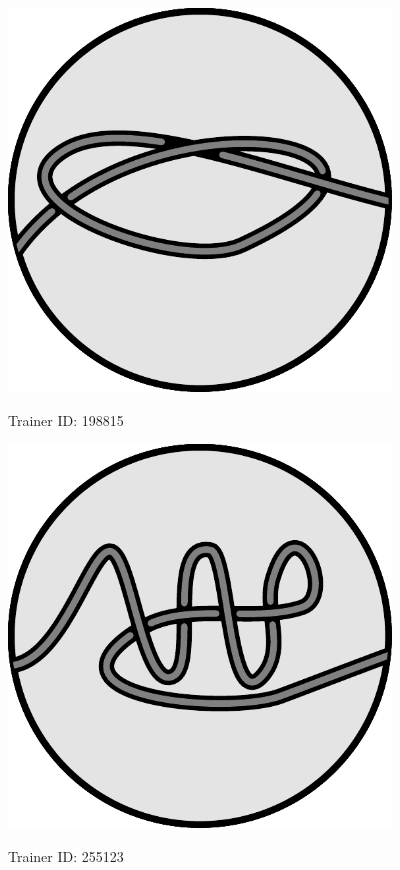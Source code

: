  \begin{center}

    \includegraphics[width=4in]{assets/knot1.pdf}

    \Huge Trainer ID: 198815
%
%
%
  \end{center}

  \begin{center}
    \includegraphics[width=4in]{assets/unknot2.pdf}

    \Huge Trainer ID: 255123 
%
%
  \end{center}

